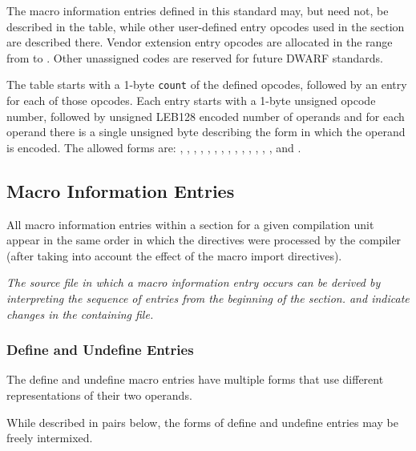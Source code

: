\begin{enumerate}[1. ]
The macro information entries defined in this standard may, but need not, be
described in the table, while other user-defined entry opcodes used in the section
are described there.  Vendor extension entry opcodes are
allocated in the range from \DWMACROlouser{} to \DWMACROhiuser. Other
unassigned codes are reserved for future DWARF standards.

The table starts with a 1-byte \texttt{count} of the defined opcodes, followed by
an entry for each of those opcodes.  Each entry starts with a 1-byte unsigned
opcode number, followed by unsigned LEB128 encoded number of operands
and for each operand there is a single unsigned byte describing the form in which
the operand is encoded.  The allowed forms are: 
\DWFORMblock, \DWFORMblockone, \DWFORMblocktwo, \DWFORMblockfour,
\DWFORMdataone, \DWFORMdatatwo, \DWFORMdatafour, \DWFORMdataeight, 
\DWFORMdatasixteen, \DWFORMsdata, \DWFORMudata, \DWFORMflag, \DWFORMsecoffset,
\DWFORMstring, \DWFORMstrp{} and \DWFORMstrx.
\end{enumerate}

\subsection{Macro Information Entries}
\label{chap:macroinformationentries}
All macro information entries within a \dotdebugmacro{}
section for a given compilation unit appear in the same 
order in which the directives were processed by the 
compiler (after taking into account the effect of the
macro import directives).

\textit{The source file in which a macro information entry occurs
can be derived by interpreting the sequence of entries from the
beginning of the \dotdebugmacro{} section. \DWMACROstartfile{} and 
\DWMACROendfile{} indicate changes in the containing file.} 

\subsubsection{Define and Undefine Entries}
\label{chap:defineandundefineentries}
The define and undefine macro entries have multiple forms that
use different representations of their two operands.

While described in pairs below, the forms of define 
and undefine entries may be freely intermixed.

